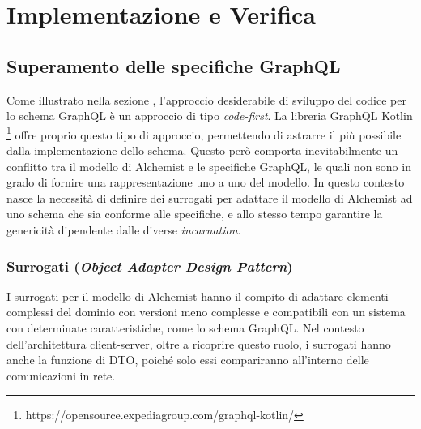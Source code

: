 \chapter{Implementazione e Verifica}\label{chap:implementation}

\section{Superamento delle specifiche GraphQL}\label{sec:overcoming-gql-specs}
Come illustrato nella sezione , l'approccio desiderabile di sviluppo del codice per lo schema GraphQL è un approccio di
tipo \textit{code-first}. La libreria GraphQL Kotlin \footnote{https://opensource.expediagroup.com/graphql-kotlin/} offre proprio questo tipo di
approccio, permettendo di astrarre il più possibile dalla implementazione dello schema. Questo però comporta inevitabilmente un conflitto tra il modello
di Alchemist e le specifiche GraphQL, le quali non sono in grado di fornire una rappresentazione uno a uno del modello.
In questo contesto nasce la necessità di definire dei surrogati per adattare il modello di Alchemist ad uno schema che sia conforme alle specifiche,
e allo stesso tempo garantire la genericità dipendente dalle diverse \textit{incarnation}.

\subsection{Surrogati (\textit{Object Adapter Design Pattern})}\label{ssec:surrogates}
I surrogati per il modello di Alchemist hanno il compito di adattare elementi complessi del dominio con versioni meno complesse e compatibili
con un sistema con determinate caratteristiche, come lo schema GraphQL. Nel contesto dell'architettura client-server, oltre a ricoprire questo ruolo,
i surrogati hanno anche la funzione di \ac{DTO}, poiché solo essi compariranno all'interno delle comunicazioni in rete.

